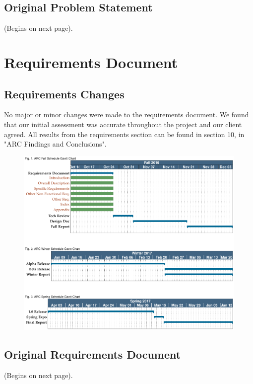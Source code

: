 \documentclass[compsoc,draftclsnofoot,onecolumn,10pt]{IEEEtran}
\begin{document}
\subsection{Original Problem Statement}
(Begins on next page).



\clearpage
\section{Requirements Document}

\subsection{Requirements Changes}
No major or minor changes were made to the requirements document. We found that our initial assessment was accurate throughout the project and our client agreed. All results from the requirements section can be found in section 10, in "ARC Findings and Conclusions". 
\begin{figure}[h!]
\includegraphics[scale=.5]{gantt}
\end{figure}

\subsection{Original Requirements Document}
(Begins on next page).

% 
\end{document}
